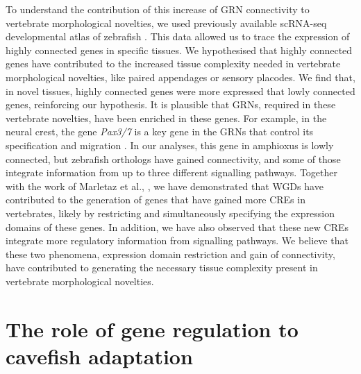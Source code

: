To understand the contribution of this increase of GRN connectivity to vertebrate morphological novelties, we used previously available scRNA-seq developmental atlas of zebrafish \parencite{farnsworth_single-cell_2020}. This data allowed us to trace the expression of highly connected genes in specific tissues. We hypothesised that highly connected genes have contributed to the increased tissue complexity needed in vertebrate morphological novelties, like paired appendages or sensory placodes. We find that, in novel tissues, highly connected genes were more expressed that lowly connected genes, reinforcing our hypothesis. It is plausible that GRNs, required in these vertebrate novelties, have been enriched in these genes. For example, in the neural crest, the gene \textit{Pax3/7} is a key gene in the GRNs that control its specification and migration \parencite{simoes-costa_establishing_2015}. In our analyses, this gene in amphioxus is lowly connected, but zebrafish orthologs have gained connectivity, and some of those integrate information from up to three different signalling pathways. Together with the work of Marletaz et al., \parencite{marletaz_amphioxus_2018}, we have demonstrated that WGDs have contributed to the generation of genes that have gained more CREs in vertebrates, likely by restricting and simultaneously specifying the expression domains of these genes. In addition, we have also observed that these new CREs integrate more regulatory information from signalling pathways. We believe that these two phenomena, expression domain restriction and gain of connectivity, have contributed to generating the necessary tissue complexity present in vertebrate morphological novelties.




\chapter{The role of gene regulation to cavefish adaptation}

